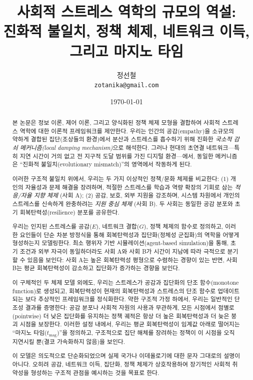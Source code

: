 \documentclass[11pt]{article}
\title{사회적 스트레스 역학의 규모의 역설:\\
진화적 불일치, 정책 체제, 네트워크 이득, 그리고 마지노 타임}
\author{정선철\\[4pt]
\small \texttt{zotanika@gmail.com}
}
\date{\today}
\theoremstyle{plain}
\begin{document}
\maketitle

\begin{abstract}
본 논문은 정보 이론, 제어 이론, 그리고 양식화된 정책 체제 모형을 결합하여 사회적 스트레스 역학에 대한 이론적 프레임워크를 제안한다.
우리는 인간의 공감(empathy)을 소규모의 약하게 결합된 집단(조상들의 환경)에서 분산과 스트레스를 흡수하기 위해 진화한 \emph{국소적 감쇠 메커니즘(local damping mechanism)}으로 해석한다.
그러나 현대의 초연결 네트워크---특히 지연 시간이 거의 없고 전 지구적 도달 범위를 가진 디지털 환경---에서, 동일한 메커니즘은 ``진화적 불일치(evolutionary mismatch)''의 영역에서 작동하게 된다.

이러한 구조적 불일치 위에서, 우리는 두 가지 이상적인 정책/문화 체제를 비교한다:
(1) 개인의 자율성과 문제 해결을 장려하며, 적절한 스트레스를 학습과 역량 확장의 기회로 삼는 \emph{적응/자율 지향 체제} (사회 A);
(2) 공감, 보호, 외부 지원을 강조하며, 시스템 차원에서 개인의 스트레스를 신속하게 완충하려는 \emph{지원 중심 체제} (사회 B).
두 사회는 동일한 공감 분포와 초기 회복탄력성(resilience) 분포를 공유한다.

우리는 인지된 스트레스를 공감($E$), 네트워크 결합($G$), 정책 체제의 함수로 정의하고, 이러한 요인들이 단순 차분 방정식을 통해 회복탄력성과 집단화(정체성 군집화)의 역학을 어떻게 형성하는지 모델링한다.
최소 행위자 기반 시뮬레이션(agent-based simulation)을 통해, 초기 조건과 외부 자극이 동일하더라도 사회 A와 사회 B가 시간이 지남에 따라 극적으로 분기할 수 있음을 보인다:
사회 A는 높은 회복탄력성 평형으로 수렴하는 경향이 있는 반면, 사회 B는 평균 회복탄력성이 감소하고 집단화가 증가하는 경향을 보인다.

이 구체적인 두 체제 모델 외에도, 우리는 스트레스가 공감과 집단화의 단조 함수(monotone function)로 생성되고, 회복탄력성이 현재의 회복탄력성과 스트레스의 단조 함수로 업데이트되는 보다 추상적인 프레임워크를 정식화한다.
약한 구조적 가정 하에서, 우리는 일반적인 단조성 결과를 증명한다: 공감 분포나 사회적 자원의 사용과 무관하게, 모든 시점에서 점별로(pointwise) 더 낮은 집단화를 유지하는 정책 궤적은 항상 더 높은 회복탄력성과 더 늦은 붕괴 시점을 보장한다.
이러한 설정 내에서, 우리는 평균 회복탄력성이 임계값 아래로 떨어지는 ``마지노 타임($t_{\text{mag}}$)''을 정의하고, 구조적으로 집단 해체를 장려하는 정책이 이 시점을 오직 지연시킬 뿐(결코 가속화하지 않음)을 보인다.

이 모델은 의도적으로 단순화되었으며 실제 국가나 이데올로기에 대한 문자 그대로의 설명이 아니다. 오히려 공감, 네트워크 이득, 집단화, 정책 체제가 상호작용하여 장기적인 사회적 취약성을 형성하는 구조적 관점을 예시하는 것을 목표로 한다.
\end{abstract}
\end{document}
